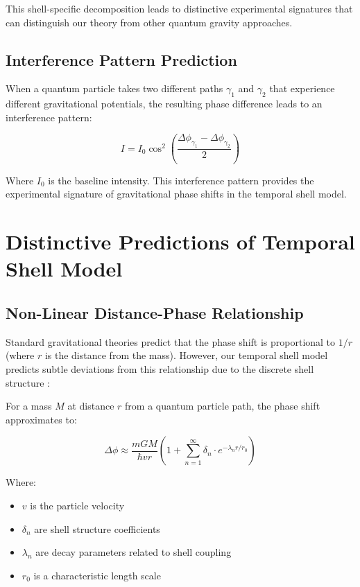 \documentclass[12pt,a4paper]{article}
\begin{document}
This shell-specific decomposition leads to distinctive experimental signatures that can distinguish our theory from other quantum gravity approaches.

\subsection{Interference Pattern Prediction}

When a quantum particle takes two different paths $\gamma_1$ and $\gamma_2$ that experience different gravitational potentials, the resulting phase difference leads to an interference pattern:

\begin{equation}
I = I_0 \cos^2\left(\frac{\Delta \phi_{\gamma_1} - \Delta \phi_{\gamma_2}}{2}\right)
\end{equation}

Where $I_0$ is the baseline intensity. This interference pattern provides the experimental signature of gravitational phase shifts in the temporal shell model.

\section{Distinctive Predictions of Temporal Shell Model}

\subsection{Non-Linear Distance-Phase Relationship}

Standard gravitational theories predict that the phase shift is proportional to $1/r$ (where $r$ is the distance from the mass). However, our temporal shell model predicts subtle deviations from this relationship due to the discrete shell structure \citep{neutron}:

For a mass $M$ at distance $r$ from a quantum particle path, the phase shift approximates to:

\begin{equation}
\Delta \phi \approx \frac{m G M}{\hbar v r} \left(1 + \sum_{n=1}^{\infty} \delta_n \cdot e^{-\lambda_n r/r_0}\right)
\end{equation}

Where:
\begin{itemize}
    \item $v$ is the particle velocity
    \item $\delta_n$ are shell structure coefficients
    \item $\lambda_n$ are decay parameters related to shell coupling
    \item $r_0$ is a characteristic length scale
\end{itemize}
\end{document}
